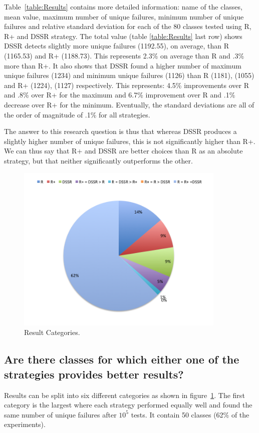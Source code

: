 \documentclass{acm_proc_article-sp}
\begin{document}
Table~\ref{table:Results} contains more detailed information: name of the classes, mean value, maximum number of unique failures, minimum number of unique failures and relative standard deviation for each of the 80 classes tested using R, R+ and DSSR strategy. The total value (table \ref{table:Results} last row) shows DSSR detects slightly more unique failures (1192.55), on average, than R (1165.53) and R+ (1188.73). This represents 2.3\% on average than R and .3\% more than R+. It also shows that DSSR found a higher number of maximum unique failures (1234) and minimum unique failures (1126) than R (1181), (1055) and R+ (1224), (1127) respectively. This represents: 4.5\% improvements over R and .8\% over R+ for the maximum and 6.7\% improvement over R and .1\% decrease over R+ for the minimum. Eventually, the standard deviations are all of the order of magnitude of .1\% for all strategies.

The answer to this research question is thus that whereas DSSR produces a slightly higher number of unique failures, this is not significantly higher than R+. We can thus say that R+ and DSSR are better choices than R as an absolute strategy, but that neither significantly outperforms the other. 


\begin{figure}[ht]
\centering
\includegraphics[width=10cm]{pie2.png}
\caption{Result Categories.}
\label{fig:pie}
\end{figure}

\subsection{Are there classes for which either one of the strategies provides better results?}

Results can be split into six different categories as shown in figure~\ref{fig:pie}. The first category is the largest where each strategy performed equally well and found the same number of unique failures after $10^5$ tests. It contain 50 classes (62\% of the experiments).
\end{document}
